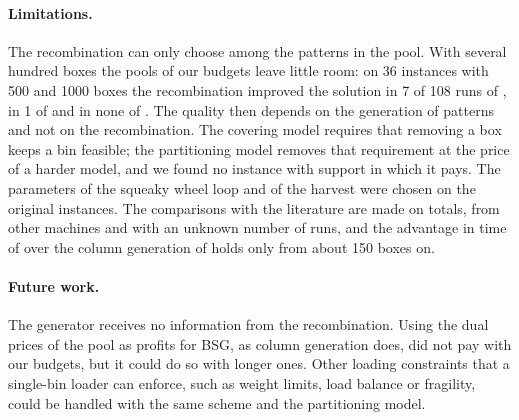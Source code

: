\paragraph{Limitations.}
The recombination can only choose among the patterns in the pool. With several hundred boxes the pools
of our budgets leave little room: on 36 instances with 500 and 1000 boxes the recombination improved the solution in 7 of 108 runs of \cfgfast{},
in 1 of \cfgbal{} and in none of \cfgqual{}. The quality then depends on the generation of patterns and not on the recombination.
The covering model requires that removing a box keeps a bin feasible; the partitioning model removes that requirement at the price of a
harder model, and we found no instance with support in which it pays. The parameters of the squeaky wheel loop
and of the harvest were chosen on the original instances. The comparisons with the literature are made on
totals, from other machines and with an unknown number of runs, and the advantage in time of \cfgqual{} over the column generation of
\citet{Mahvash2018} holds only from about 150 boxes on.

\paragraph{Future work.}
The generator receives no information from the recombination. Using the dual prices of the pool as
profits for BSG, as column generation does, did not pay with our budgets, but it could do so with longer ones.
Other loading constraints that a single-bin loader can enforce, such as weight limits, load balance or fragility,
could be handled with the same scheme and the partitioning model.
